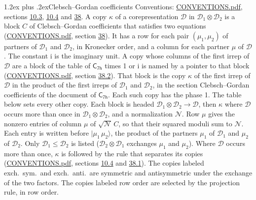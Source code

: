 \documentclass[10pt,a4paper]{article}
\makeatletter
\renewcommand\section{\@startsection{section}{1}{\z@}{-3ex plus -1ex minus -.2ex}%
  {1.2ex plus .2ex}{\normalfont\large\sffamily\bfseries\color{parttitle}}}
\numberwithin{equation}{section}
\newcommand{\grp}[1]{\mathsf{#1}}
\newcommand{\iunit}{\mathrm{i}}
\newcommand{\irrprod}{\otimes}
\newcommand{\mult}{\kappa}
\newcommand{\intx}{\mu}
\newcommand{\cgnorm}{\mathcal{N}}
\newcommand{\prodket}[2]{\lvert {#1}\,{#2}\rangle}
\makeatother
\begin{document}
\section{Clebsch--Gordan coefficients}\label{s:clebsch_gordan}
Conventions: \href{../../CONVENTIONS.pdf}{CONVENTIONS.pdf}, sections \href{../../../rotation/CONVENTIONS.pdf\#conv.10.3}{10.3}, \href{../../../rotation/CONVENTIONS.pdf\#conv.10.4}{10.4} and \href{../../CONVENTIONS.pdf\#conv.38}{38}.
\leavevmode\label{n:index.copy}\label{n:matrix.cg.stored}A copy $\mult$ of a corepresentation $\mathcal{D}$ in $\mathcal{D}_1\irrprod\mathcal{D}_2$ is a block $C$ of Clebsch--Gordan coefficients that satisfies two equations (\href{../../CONVENTIONS.pdf}{CONVENTIONS.pdf}, section \href{../../CONVENTIONS.pdf\#conv.38}{38}). \label{n:index.cg}It has a row for each pair $(\intx_1, \intx_2)$ of partners of $\mathcal{D}_1$ and $\mathcal{D}_2$, in Kronecker order, and a column for each partner $\intx$ of $\mathcal{D}$.
The constant $\iunit$ is the imaginary unit.
A copy whose columns of the first irrep of $\mathcal{D}$ are a block of the table of $\grp{C_{7h}}$ times 1 or $\iunit$ is named by a pointer to that block (\href{../../CONVENTIONS.pdf}{CONVENTIONS.pdf}, section \href{../../CONVENTIONS.pdf\#conv.38.2}{38.2}). That block is the copy $\mult$ of the first irrep of $\mathcal{D}$ in the product of the first irreps of $\mathcal{D}_1$ and $\mathcal{D}_2$, in the section Clebsch--Gordan coefficients of the document of \href{../../../rotation/data/pdf/C7h.pdf}{$\grp{C_{7h}}$}. Each such copy has the phase 1. The table below sets every other copy.
Each block is headed $\mathcal{D}_1\irrprod\mathcal{D}_2\to\mathcal{D}$, then $\mult$ where $\mathcal{D}$ occurs more than once in $\mathcal{D}_1\irrprod\mathcal{D}_2$, and a normalization $\cgnorm$. Row $\intx$ gives the nonzero entries of column $\intx$ of $\sqrt{\cgnorm}\,C$, so that their squared moduli sum to $\cgnorm$. \label{n:vector.ket.product}Each entry is written before $\prodket{\intx_1}{\intx_2}$, the product of the partners $\intx_1$ of $\mathcal{D}_1$ and $\intx_2$ of $\mathcal{D}_2$. Only $\mathcal{D}_1 \le \mathcal{D}_2$ is listed ($\mathcal{D}_2\irrprod\mathcal{D}_1$ exchanges $\intx_1$ and $\intx_2$).
Where $\mathcal{D}$ occurs more than once, $\mult$ is followed by the rule that separates its copies (\href{../../CONVENTIONS.pdf}{CONVENTIONS.pdf}, sections \href{../../../rotation/CONVENTIONS.pdf\#conv.10.4}{10.4} and \href{../../CONVENTIONS.pdf\#conv.38.1}{38.1}). \label{n:abbreviation.exchange}The copies labeled exch.\ sym.\ and exch.\ anti.\ are symmetric and antisymmetric under the exchange of the two factors. The copies labeled row order are selected by the projection rule, in row order.
\end{document}
